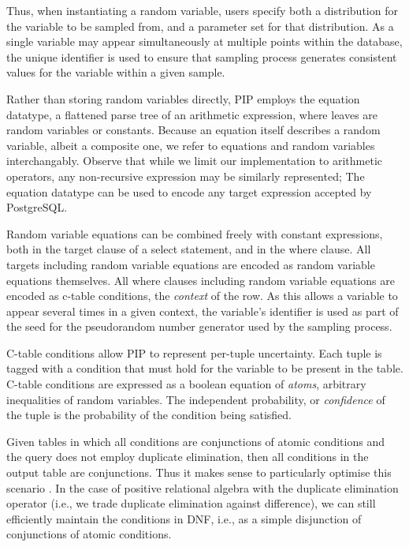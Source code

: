 Thus, when instantiating a random variable, users specify both a distribution for the variable to be sampled from, and a parameter set for that distribution.  As a single variable may appear simultaneously at multiple points within the database, the unique identifier is used to ensure that sampling process generates consistent values for the variable within a given sample.  

Rather than storing random variables directly, PIP employs the equation datatype, a flattened parse tree of an arithmetic expression, where leaves are random variables or constants.  Because an equation itself describes a random variable, albeit a composite one, we refer to equations and random variables interchangably.  Observe that while we limit our implementation to arithmetic operators, any non-recursive expression may be similarly represented; The equation datatype can be used to encode any target expression accepted by PostgreSQL.  

Random variable equations can be combined freely with constant expressions, both in the target clause of a select statement, and in the where clause.  All targets including random variable equations are encoded as random variable equations themselves.  All where clauses including random variable equations are encoded as c-table conditions, the \textit{context} of the row.  As this allows a variable to appear several times in a given context, the variable's identifier is used as part of the seed for the pseudorandom number generator used by the sampling process.

C-table conditions allow PIP to represent per-tuple uncertainty.  Each tuple is tagged with a condition that must hold for the variable to be present in the table.  C-table conditions are expressed as a boolean equation of \textit{atoms}, arbitrary inequalities of random variables.  The independent probability, or \textit{confidence} of the tuple is the probability of the condition being satisfied.  

Given  tables  in which  all  conditions  are  conjunctions of  atomic conditions and  the query does not employ  duplicate elimination, then all conditions  in the output  table are conjunctions.  Thus  it makes sense to particularly optimise this scenario \cite{AJKO2008}. In the case of positive relational algebra  with the duplicate elimination  operator (i.e., we trade  duplicate   elimination  against  difference),   we  can  still efficiently  maintain  the  conditions  in  DNF,  i.e.,  as  a  simple disjunction of conjunctions of atomic conditions.

